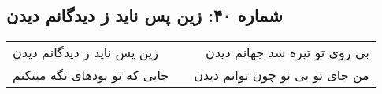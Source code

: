 \begin{center}
\section*{شماره ۴۰: زین پس ناید ز دیدگانم دیدن}
\label{sec:040}
\begin{longtable}{l p{0.5cm} r}
زین پس ناید ز دیدگانم دیدن
&&
بی روی تو تیره شد جهانم دیدن
\\
جایی که تو بودهای نگه مینکنم
&&
من جای تو بی تو چون توانم دیدن
\\
\end{longtable}
\end{center}
